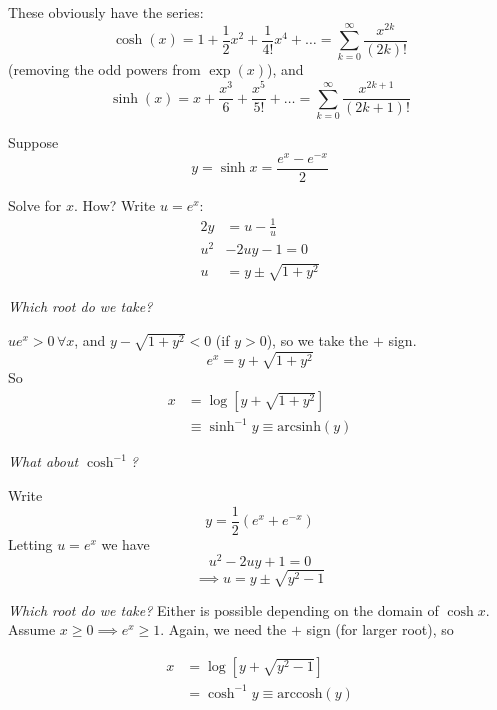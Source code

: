 \documentclass[twoside]{scrartcl}
\begin{document}
These obviously have the series:
\[\cosh(x) = 1 + \frac{1}{2}x^2 + \frac{1}{4!}x^4 + \dots = \sum_{k=0}^{\infty} \frac{x^{2k}}{(2k)!}\] 
(removing the odd powers from $\exp(x)$), and 
\[\sinh(x) = x + \frac{x^3}{6} + \frac{x^5}{5!} + \dots = \sum_{k=0}^{\infty} \frac{x^{2k+1}}{(2k+1)!}\]



  \begin{center}
\end{center}




Suppose 
\[y = \sinh x = \frac{e^{x} - e^{-x}}{2}\]

Solve for $x$. How? Write $u = e^x$:
\[
\begin{aligned}
  2y &= u - \frac{1}{u}\\
  u^2 &- 2uy - 1 = 0\\
  u &= y \pm \sqrt{1 + y^2}
\end{aligned}
\]

\emph{Which root do we take?}

$u e^x > 0\, \forall x$, and $y -\sqrt{1 + y^2} < 0$ (if $y > 0$), so we take the $+$ sign. 
\[e^x = y + \sqrt{1 + y^2}\]
So 
\[
\begin{aligned}
  x &= \log[y + \sqrt{1 + y^2}]\\
  &\equiv \sinh^{-1}y \equiv \mathrm{arcsinh}(y)
\end{aligned}
\]

\emph{What about $\cosh^{-1}$?}

Write 
\[y = \frac{1}{2}(e^x + e^{-x})\]
Letting $u = e^x$ we have 
\[u^2 - 2uy + 1= 0\]
\[\implies u = y \pm \sqrt{y^2-1}\]

\emph{Which root do we take?} Either is possible depending on the domain of $\cosh x$. Assume $x \geq 0 \implies e^x \geq 1$. Again, we need the $+$ sign (for larger root), so 

\[
\begin{aligned}
  x &= \log[y + \sqrt{y^2-1}]\\
  &= \cosh^{-1}y \equiv \mathrm{arccosh}(y)
\end{aligned}
\]
\end{document}
